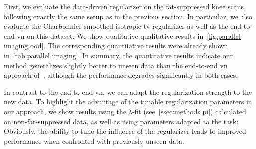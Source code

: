 First, we evaluate the data-driven regularizer on the fat-suppressed knee scans, following exactly the same setup as in the previous section.
In particular, we also evaluate the Charbonnier-smoothed isotropic \gls{tv} regularizer as well as the end-to-end \gls{vn} on this dataset.
We show qualitative qualitative results in~\cref{fig:parallel imaging ood}.
The corresponding quantitative results were already shown in~\cref{tab:parallel imaging}.
In summary, the quantitative results indicate our method generalizes slightly better to unseen data than the end-to-end \gls{vn} approach of~\cite{sriram_endtoend_2020}, although the performance degrades significantly in both cases.

In contrast to the end-to-end \gls{vn}, we can adapt the regularization strength to the new data.
To highlight the advantage of the tunable regularization parameters in our approach, we show results using the \( \lambda \)-fit (see~\cref{ssec:methods pi}) calculated on non-fat-suppressed data, as well as using parameters adapted to the task:
Obviously, the ability to tune the influence of the regularizer leads to improved performance when confronted with previously unseen data.
